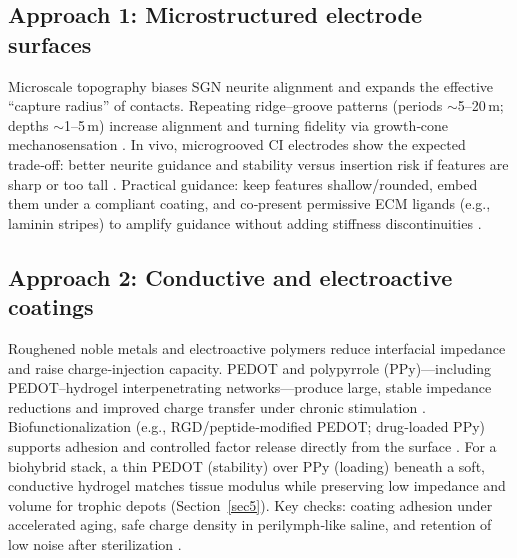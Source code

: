\documentclass[referee,pdflatex, sn-vancouver-num]{sn-jnl}%
\theoremstyle{thmstyleone}%
\theoremstyle{thmstyletwo}%
\theoremstyle{thmstylethree}%
\begin{document}
\subsection{Approach 1: Microstructured electrode surfaces}
Microscale topography biases SGN neurite alignment and expands the effective “capture radius” of contacts. Repeating ridge–groove patterns (periods $\sim$5–20\,\textmu m; depths $\sim$1–5\,\textmu m) increase alignment and turning fidelity via growth‑cone mechanosensation \cite{Wang2013,Chen2014}. In vivo, microgrooved CI electrodes show the expected trade‑off: better neurite guidance and stability versus insertion risk if features are sharp or too tall \cite{Lee2019}. Practical guidance: keep features shallow/rounded, embed them under a compliant coating, and co‑present permissive ECM ligands (e.g., laminin stripes) to amplify guidance without adding stiffness discontinuities \cite{Evans2007LamininFibronectin,Vega1995LamininCollagenIV}.

\subsection{Approach 2: Conductive and electroactive coatings}
Roughened noble metals and electroactive polymers reduce interfacial impedance and raise charge‑injection capacity. PEDOT and polypyrrole (PPy)—including PEDOT–hydrogel interpenetrating networks—produce large, stable impedance reductions and improved charge transfer under chronic stimulation \cite{Venkatraman2011-ql,Goding2017,Dalrymple2020,ABIDIAN20081273}. Biofunctionalization (e.g., RGD/peptide‑modified PEDOT; drug‑loaded PPy) supports adhesion and controlled factor release directly from the surface \cite{Chikar2012,Richardson2007,Richardson2009}. For a biohybrid stack, a thin PEDOT (stability) over PPy (loading) beneath a soft, conductive hydrogel matches tissue modulus while preserving low impedance and volume for trophic depots (Section~\ref{sec5}). Key checks: coating adhesion under accelerated aging, safe charge density in perilymph‑like saline, and retention of low noise after sterilization \cite{Venkatraman2011-ql,Dalrymple2020,Green2012}.
\end{document}
